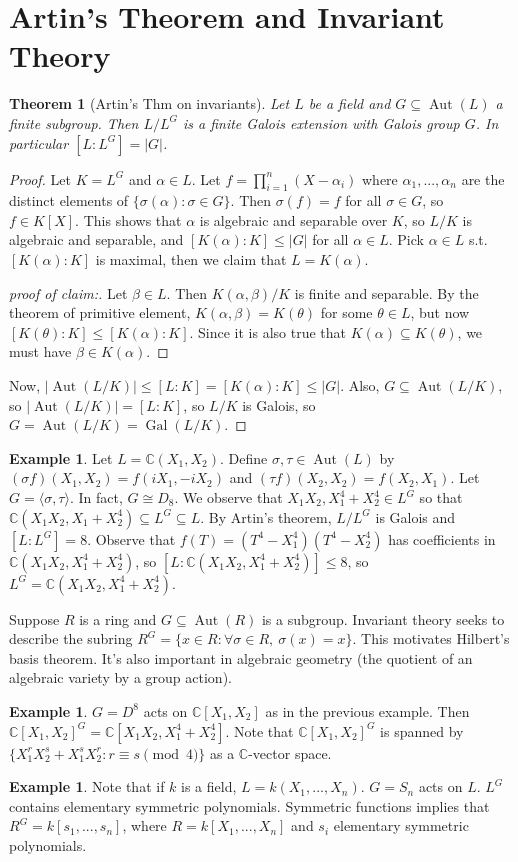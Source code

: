 \documentclass{article}
\theoremstyle{definition}
\newtheorem{example}[defn]{Example}
\theoremstyle{remark}
\theoremstyle{plain}
\newtheorem{thm}[defn]{Theorem}
\newcommand{\CC}{\mathbb{C}}
\newcommand{\Aut}{\operatorname{Aut}}
\newcommand{\Gal}{\operatorname{Gal}}
\begin{document}
\section{Artin's Theorem and Invariant Theory}
\begin{thm}[Artin's Thm on invariants]
Let $L$ be a field and $G\subseteq \operatorname{Aut}(L)$ a finite subgroup. Then $L/L^G$ is a finite Galois extension with Galois group $G$. In particular $[L:L^G]=|G|$.    
\end{thm}
\begin{proof}
    Let $K=L^G$ and $\alpha\in L$. Let $f=\prod_{i=1}^n(X-\alpha_i)$ where $\alpha_1,...,\alpha_n$ are the distinct elements of $\{\sigma(\alpha):\sigma\in G\}$. Then $\sigma(f)=f$ for all $\sigma\in G$, so $f\in K[X]$. This shows that $\alpha$ is algebraic and separable over $K$, so $L/K$ is algebraic and separable, and $[K(\alpha):K]\le |G|$ for all $\alpha\in L$. Pick $\alpha\in L$ s.t. $[K(\alpha):K]$ is maximal, then we claim that $L=K(\alpha)$.
    \begin{proof}[proof of claim:]
        Let $\beta\in L$. Then $K(\alpha,\beta)/K$ is finite and separable. By the theorem of primitive element, $K(\alpha,\beta)=K(\theta)$ for some $\theta\in L$, but now $[K(\theta):K]\le [K(\alpha):K]$. Since it is also true that $K(\alpha)\subseteq K(\theta)$, we must have $\beta\in K(\alpha)$.
    \end{proof}
    Now, $|\Aut(L/K)|\le [L:K]=[K(\alpha):K]\le |G|$. Also, $G\subseteq \Aut(L/K)$, so $|\Aut(L/K)|=[L:K]$, so $L/K$ is Galois, so $G=\Aut(L/K)=\Gal(L/K)$.
\end{proof}
\begin{example}
    Let $L=\CC(X_1,X_2)$. Define $\sigma,\tau\in\Aut(L)$ by $(\sigma f)(X_1,X_2)=f(iX_1,-iX_2)$ and $(\tau f)(X_2,X_2)=f(X_2,X_1)$. Let $G=\langle\sigma,\tau\rangle$. In fact, $G\cong D_8$. We observe that $X_1X_2,X_1^4+X_2^4\in L^G$ so that $\CC(X_1X_2,X_1+X_2^4)\subseteq L^G\subseteq L$. By Artin's theorem, $L/L^G$ is Galois and $[L:L^G]=8$. Observe that $f(T)=(T^4-X_1^4)(T^4-X_2^4)$ has coefficients in $\CC(X_1X_2,X_1^4+X_2^4)$, so $[L:\CC(X_1X_2,X_1^4+X_2^4)]\le 8$, so $L^G=\CC(X_1X_2,X_1^4+X_2^4)$.
\end{example}
Suppose $R$ is a ring and $G\subseteq \Aut(R)$ is a subgroup. Invariant theory seeks to describe the subring $R^G=\{x\in R: \forall \sigma\in R,\ \sigma(x)=x\}$. This motivates Hilbert's basis theorem. It's also important in algebraic geometry (the quotient of an algebraic variety by a group action).
\begin{example}
    $G=D^8$ acts on $\CC[X_1,X_2]$ as in the previous example. Then $\CC[X_1,X_2]^G=\CC[X_1X_2,X_1^4+X_2^4]$. Note that $\CC[X_1,X_2]^G$ is spanned by $\{X_1^rX_2^s+X_1^sX_2^r:r\equiv s\pmod 4\}$ as a $\CC$-vector space.
\end{example}
\begin{example}
    Note that if $k$ is a field, $L=k(X_1,...,X_n)$. $G=S_n$ acts on $L$. $L^G$ contains elementary symmetric polynomials. Symmetric functions implies that $R^G=k[s_1,...,s_n]$, where $R=k[X_1,...,X_n]$ and $s_i$ elementary symmetric polynomials.
\end{example}
\end{document}
